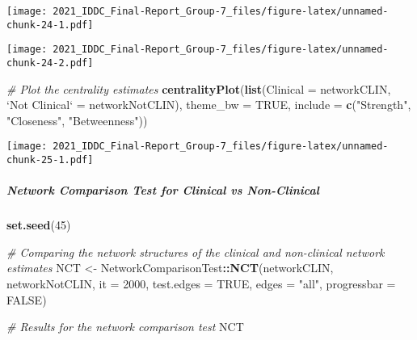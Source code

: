 \documentclass[
]{article}
\newenvironment{Shaded}{\begin{snugshade}}{\end{snugshade}}
\newcommand{\CommentTok}[1]{\textcolor[rgb]{0.56,0.35,0.01}{\textit{#1}}}
\newcommand{\DataTypeTok}[1]{\textcolor[rgb]{0.13,0.29,0.53}{#1}}
\newcommand{\DecValTok}[1]{\textcolor[rgb]{0.00,0.00,0.81}{#1}}
\newcommand{\KeywordTok}[1]{\textcolor[rgb]{0.13,0.29,0.53}{\textbf{#1}}}
\newcommand{\NormalTok}[1]{#1}
\newcommand{\OperatorTok}[1]{\textcolor[rgb]{0.81,0.36,0.00}{\textbf{#1}}}
\newcommand{\OtherTok}[1]{\textcolor[rgb]{0.56,0.35,0.01}{#1}}
\newcommand{\StringTok}[1]{\textcolor[rgb]{0.31,0.60,0.02}{#1}}
\begin{document}
\texttt{[image: 2021\_IDDC\_Final-Report\_Group-7\_files/figure-latex/unnamed-chunk-24-1.pdf]}

\begin{Shaded}
\end{Shaded}

\texttt{[image: 2021\_IDDC\_Final-Report\_Group-7\_files/figure-latex/unnamed-chunk-24-2.pdf]}

\begin{Shaded}
\begin{Highlighting}[]
\CommentTok{# Plot the centrality estimates}
\KeywordTok{centralityPlot}\NormalTok{(}\KeywordTok{list}\NormalTok{(}\DataTypeTok{Clinical =}\NormalTok{ networkCLIN,}
                    \StringTok{`}\DataTypeTok{Not Clinical}\StringTok{`}\NormalTok{ =}\StringTok{ }\NormalTok{networkNotCLIN),}
               \DataTypeTok{theme_bw =} \OtherTok{TRUE}\NormalTok{,}
               \DataTypeTok{include =} \KeywordTok{c}\NormalTok{(}\StringTok{"Strength"}\NormalTok{,}
                           \StringTok{"Closeness"}\NormalTok{,}
                           \StringTok{"Betweenness"}\NormalTok{))}
\end{Highlighting}
\end{Shaded}

\texttt{[image: 2021\_IDDC\_Final-Report\_Group-7\_files/figure-latex/unnamed-chunk-25-1.pdf]}

\hypertarget{network-comparison-test-for-clinical-vs-non-clinical}{%
\subparagraph{Network Comparison Test for Clinical vs
Non-Clinical}\label{network-comparison-test-for-clinical-vs-non-clinical}}

\begin{Shaded}
\begin{Highlighting}[]
\KeywordTok{set.seed}\NormalTok{(}\DecValTok{45}\NormalTok{)}

\CommentTok{# Comparing the network structures of the clinical and non-clinical network estimates}
\NormalTok{NCT <-}\StringTok{ }
\NormalTok{NetworkComparisonTest}\OperatorTok{::}\KeywordTok{NCT}\NormalTok{(networkCLIN, networkNotCLIN,}
                           \DataTypeTok{it =} \DecValTok{2000}\NormalTok{,}
                           \DataTypeTok{test.edges =} \OtherTok{TRUE}\NormalTok{,}
                           \DataTypeTok{edges =} \StringTok{"all"}\NormalTok{,}
                           \DataTypeTok{progressbar =} \OtherTok{FALSE}\NormalTok{)}

\CommentTok{# Results for the network comparison test}
\NormalTok{NCT}
\end{Highlighting}
\end{Shaded}
\end{document}

